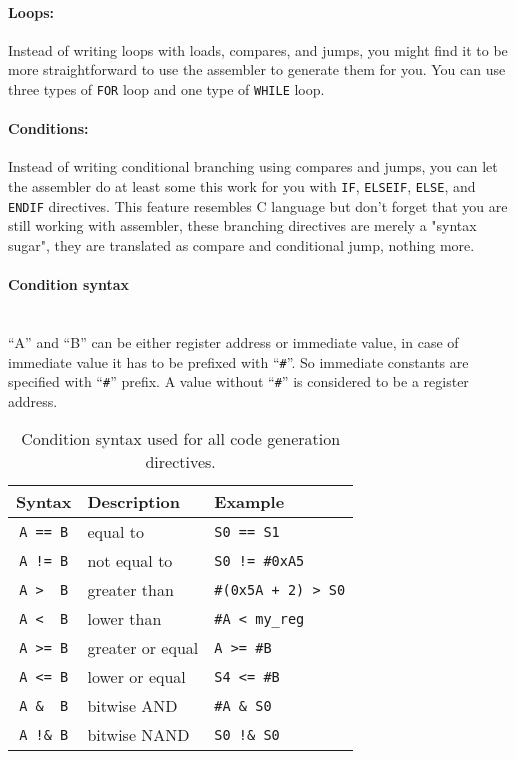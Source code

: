     \paragraph{Loops:} Instead of writing loops with loads, compares, and jumps, you might find it to be more straightforward to use the assembler to generate them for you. You can use three types of \texttt{FOR} loop and one type of \texttt{WHILE} loop.

    \paragraph{Conditions:} Instead of writing conditional branching using compares and jumps, you can let the assembler do at least some this work for you with \texttt{IF}, \texttt{ELSEIF}, \texttt{ELSE}, and \texttt{ENDIF} directives. This feature resembles C language but don't forget that you are still working with assembler, these branching directives are merely a "syntax sugar", they are translated as compare and conditional jump, nothing more.

    \paragraph{Condition syntax}
        ~\\``A'' and ``B'' can be either register address or immediate value, in case of immediate value it has to be prefixed with ``\texttt{\#}''. So immediate constants are specified with ``\texttt{\#}'' prefix. A value without ``\texttt{\#}'' is considered to be a register address.

        \begin{table}[h!]
            \centering
            \begin{tabular}{|c|l|l|}
                \hline
                \textbf{Syntax} & \textbf{Description} & \textbf{Example} \\\hline
                \verb'A == B' & equal to         & \verb'S0 == S1' \\
                \verb'A != B' & not equal to     & \verb'S0 != #0xA5' \\
                \verb'A >  B' & greater than     & \verb'#(0x5A + 2) > S0' \\
                \verb'A <  B' & lower than       & \verb'#A < my_reg' \\
                \verb'A >= B' & greater or equal & \verb'A >= #B' \\
                \verb'A <= B' & lower or equal   & \verb'S4 <= #B' \\
                \verb'A &  B' & bitwise AND      & \verb'#A & S0' \\
                \verb'A !& B' & bitwise NAND     & \verb'S0 !& S0' \\\hline
            \end{tabular}
            \caption{Condition syntax used for all code generation directives.}
        \end{table}

